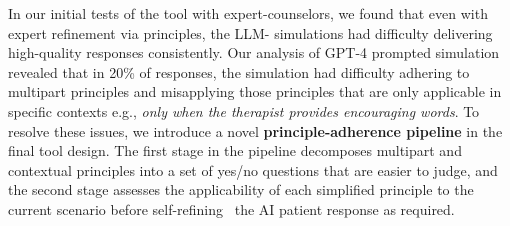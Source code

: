 \documentclass[11pt]{article}
\begin{document}

In our initial tests of the tool with expert-counselors, we found that even with expert refinement via principles, the LLM- simulations had difficulty delivering high-quality responses consistently.
Our analysis of GPT-4 prompted simulation revealed that in 20\% of responses, the simulation had difficulty adhering to multipart principles and misapplying those principles that are only applicable in specific contexts e.g., \textit{only when the therapist provides encouraging words}.
To resolve these issues, we introduce a novel \textbf{principle-adherence pipeline} in the final tool design. The first stage in the pipeline decomposes multipart and contextual principles into a set of yes/no questions that are easier to judge, and the second stage assesses the applicability of each simplified principle to the current scenario before self-refining~\cite{madaan2024self} the AI patient response as required.
\end{document}
